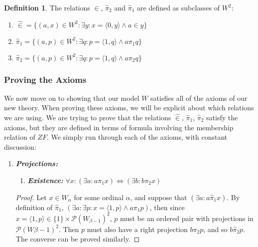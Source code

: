 \documentclass[11pt]{report}
\newcommand{\pleft}{\mathrel{\pi_1}}
\newcommand{\pright}{\mathrel{\pi_2}}
\newcommand{\pair}[2]{\langle #1,#2 \rangle}
\newcommand{\zin}{\mathrel{\widehat{\in}}}
\newcommand{\zpright}{\mathrel{\widehat{\pi}_2}}
\newcommand{\zpleft}{\mathrel{\widehat{\pi}_1}}
\theoremstyle{definition}
\theoremstyle{theorem}
\theoremstyle{lemma}
\newtheorem{definition}{Definition}[section]
\begin{document}
\begin{definition} The relations $\zin$, $\zpright$ and $\zpleft$ are defined as subclasses of $W^2$:
  \begin{enumerate}[label=(\roman*)]
    \item $\zin = \{(a,x)\in W^2: \exists y: x = \pair{0}{y} \wedge a \in y\}$
    \item $\zpleft = \{(a,p)\in W^2 : \exists q: p = \pair{1}{q} \wedge a\pleft q\}$
    \item $\zpright = \{(a,p)\in W^2 : \exists q: p = \pair{1}{q} \wedge a\pright q\}$
  \end{enumerate}
\end{definition}

\subsubsection{Proving the Axioms}
We now move on to showing that our model $W$ satisfies all of the axioms of our new theory. When proving these axioms, we will be explicit about which relations we are using. We are trying to prove that the relations $\zin$, $\zpleft$, $\zpright$ satisfy the axioms, but they are defined in terms of formula involving the membership relation of $\mathit{ZF}$. We simply run through each of the axioms, with constant discussion:

\begin{enumerate}[series=axiomlist, label=\Roman*.]
  \item \textit{\textbf{Projections:}}
        \begin{enumerate}[series=sublist, label=(\roman*)]
        \item \textit{\textbf{Existence:}} $\forall x: (\exists a: a\pleft x) \Leftrightarrow (\exists b: b\pright x)$
        \end{enumerate}
        \begin{proof}
        Let $x\in W_\alpha$ for some ordinal $\alpha$, and suppose that $(\exists a: a\zpleft x)$.
        By definition of $\zpleft$, $(\exists a: \exists p: x = \pair{1}{p} \wedge a \pleft p)$, then since $x = \pair{1}{p}\in \{1\}\times\mathcal{P}(W_{\beta-1})^2$, $p$ must be an ordered pair with projections in $\mathcal{P}(W\beta-1)^2$. 
        Then $p$ must also have a right projection $b \pright p$, and so $b\zpright p$.
        The converse can be proved similarly.
      \end{proof}
\end{enumerate}
\end{document}
